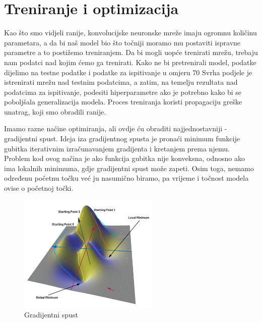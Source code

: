 
\chapter{Treniranje i optimizacija}\label{ch:treniranje-i-optimizacija}

Kao što smo vidjeli ranije, konvolucijske neuronske mreže imaju ogromnu količinu parametara, a da bi naš model bio što točniji moramo mu postaviti ispravne parametre a to postižemo treniranjem.
Da bi mogli uopće trenirati mrežu, trebaju nam podatci nad kojim ćemo ga trenirati.
Kako ne bi pretrenirali model, podatke dijelimo na testne podatke i podatke za ispitivanje u omjeru 70%
Svrha podjele je istrenirati mrežu nad testnim podatcima, a zatim, na temelju rezultata nad podatcima za ispitivanje, podesiti hiperparametre ako je potrebno kako bi se poboljšala generalizacija modela.
Proces treniranja koristi propagaciju greške unatrag, koji smo obradili ranije.

Imamo razne načine optimiranja, ali ovdje ću obraditi najjednostavniji - gradijentni spust.
Ideja iza gradijentnog spusta je pronaći minimum funkcije gubitka iterativnim izračunavanjem gradijenta i kretanjem prema njemu.
Problem kod ovog načina je ako funkcija gubitka nije konveksna, odnosno ako ima lokalnih minimuma, gdje gradijentni spust može zapeti.
Osim toga, nemamo određenu početnu točku već ju nasumično biramo, pa vrijeme i točnost modela ovise o početnoj točki.

\FloatBarrier
\begin{figure}[h]
    \centering
    \includegraphics[width=0.6\textwidth]{images/Gradijentni-spust}
    \caption{Gradijentni spust
    \protect\footnotemark}
    \label{fig:slika18}
\end{figure}
\FloatBarrier
{}

